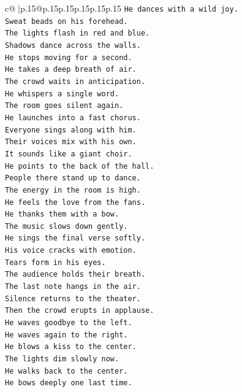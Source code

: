 \documentclass{article}
\begin{document}
{\begin{supertabular}{c@{$\;$}|p{.15\linewidth}@{}p{.15\linewidth}p{.15\linewidth}p{.15\linewidth}p{.15\linewidth}p{.15\linewidth}}
{{{\texttt{He dances with a wild joy.} \\
\texttt{Sweat beads on his forehead.} \\
\texttt{The lights flash in red and blue.} \\
\texttt{Shadows dance across the walls.} \\
\texttt{He stops moving for a second.} \\
\texttt{He takes a deep breath of air.} \\
\texttt{The crowd waits in anticipation.} \\
\texttt{He whispers a single word.} \\
\texttt{The room goes silent again.} \\
\texttt{He launches into a fast chorus.} \\
\texttt{Everyone sings along with him.} \\
\texttt{Their voices mix with his own.} \\
\texttt{It sounds like a giant choir.} \\
\texttt{He points to the back of the hall.} \\
\texttt{People there stand up to dance.} \\
\texttt{The energy in the room is high.} \\
\texttt{He feels the love from the fans.} \\
\texttt{He thanks them with a bow.} \\
\texttt{The music slows down gently.} \\
\texttt{He sings the final verse softly.} \\
\texttt{His voice cracks with emotion.} \\
\texttt{Tears form in his eyes.} \\
\texttt{The audience holds their breath.} \\
\texttt{The last note hangs in the air.} \\
\texttt{Silence returns to the theater.} \\
\texttt{Then the crowd erupts in applause.} \\
\texttt{He waves goodbye to the left.} \\
\texttt{He waves again to the right.} \\
\texttt{He blows a kiss to the center.} \\
\texttt{The lights dim slowly now.} \\
\texttt{He walks back to the center.} \\
\texttt{He bows deeply one last time.} \\
}}}
\end{supertabular}}
\end{document}
